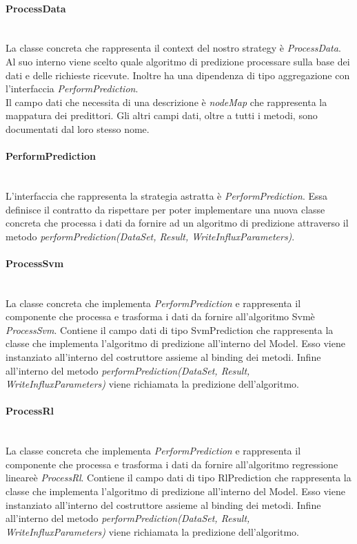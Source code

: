 \paragraph*{ProcessData} \mbox{}\\ [1mm]
La classe concreta che rappresenta il context del nostro strategy è \textit{ProcessData}. Al suo interno viene scelto quale algoritmo di predizione processare sulla base dei dati e delle richieste ricevute. Inoltre ha una dipendenza di tipo aggregazione con l'interfaccia \textit{PerformPrediction}. \\
Il campo dati che necessita di una descrizione è \textit{nodeMap} che rappresenta la mappatura dei predittori. Gli altri campi dati, oltre a tutti i metodi, sono documentati dal loro stesso nome.
\paragraph*{PerformPrediction} \mbox{}\\ [1mm]
L'interfaccia che rappresenta la strategia astratta è \textit{PerformPrediction}. Essa definisce il contratto da rispettare per poter implementare una nuova classe concreta che processa i dati da fornire ad un algoritmo di predizione attraverso il metodo \textit{performPrediction(DataSet, Result, WriteInfluxParameters)}.
\paragraph*{ProcessSvm} \mbox{}\\ [1mm]
La classe concreta che implementa \textit{PerformPrediction} e rappresenta il componente che processa e trasforma i dati da fornire all'algoritmo Svm\glosp è \textit{ProcessSvm}.
Contiene il campo dati di tipo SvmPrediction che rappresenta la classe che implementa l'algoritmo di predizione all'interno del Model. Esso viene instanziato all'interno del costruttore assieme al binding dei metodi.
Infine all'interno del metodo \textit{performPrediction(DataSet, Result, WriteInfluxParameters)} viene richiamata la predizione dell'algoritmo.
\paragraph*{ProcessRl} \mbox{}\\ [1mm]
La classe concreta che implementa \textit{PerformPrediction} e rappresenta il componente che processa e trasforma i dati da fornire all'algoritmo regressione lineare\glosp è \textit{ProcessRl}.
Contiene il campo dati di tipo RlPrediction che rappresenta la classe che implementa l'algoritmo di predizione all'interno del Model. Esso viene instanziato all'interno del costruttore assieme al binding dei metodi.
Infine all'interno del metodo \textit{performPrediction(DataSet, Result, WriteInfluxParameters)} viene richiamata la predizione dell'algoritmo.
